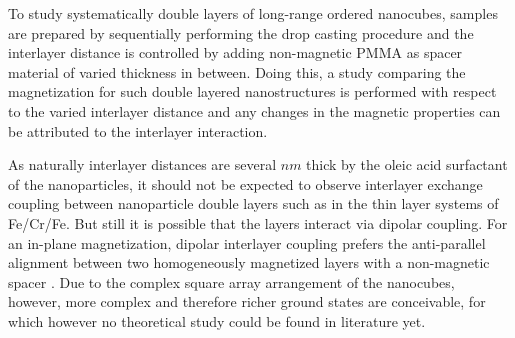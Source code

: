 \documentclass[\main/dresen_thesis.tex]{subfiles}
\begin{document}
  To study systematically double layers of long-range ordered nanocubes, samples are prepared by sequentially performing the drop casting procedure and the interlayer distance is controlled by adding non-magnetic PMMA as spacer material of varied thickness in between.
  Doing this, a study comparing the magnetization for such double layered nanostructures is performed with respect to the varied interlayer distance and any changes in the magnetic properties can be attributed to the interlayer interaction.

  As naturally interlayer distances are several $\unit{nm}$ thick by the oleic acid surfactant of the nanoparticles, it should not be expected to observe interlayer exchange coupling between nanoparticle double layers such as in the thin layer systems of Fe/Cr/Fe.
  But still it is possible that the layers interact via dipolar coupling.
  For an in-plane magnetization, dipolar interlayer coupling prefers the anti-parallel alignment between two homogeneously magnetized layers with a non-magnetic spacer \cite{Labrune_2002_Dipol}.
  Due to the complex square array arrangement of the nanocubes, however, more complex and therefore richer ground states are conceivable, for which however no theoretical study could be found in literature yet.

  

\end{document}
